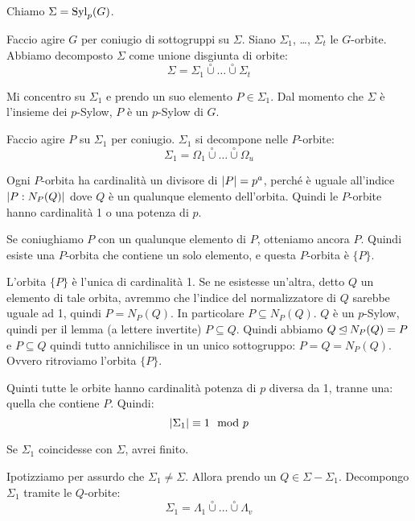 \begin{dimostrazione}
    Chiamo $\Sigma = \operatorname{Syl}_p(G)$.

    Faccio agire $G$ per coniugio di sottogruppi su $\Sigma$.
    Siano $\Sigma_1$, \dots, $\Sigma_t$ le $G$-orbite.
    Abbiamo decomposto $\Sigma$ come unione disgiunta di orbite:
    \begin{equation*}
        \Sigma = \Sigma_1 \overset{\circ}{\cup} \dots \overset{\circ}{\cup} \Sigma_t
    \end{equation*}

    Mi concentro su $\Sigma_1$ e prendo un suo elemento $P \in \Sigma_1$.
    Dal momento che $\Sigma$ è l'insieme dei $p$-Sylow, $P$ è un $p$-Sylow di $G$.

    Faccio agire $P$ su $\Sigma_1$ per coniugio.
    $\Sigma_1$ si decompone nelle $P$-orbite:
    \begin{equation*}
        \Sigma_1 = \Omega_1 \overset{\circ}{\cup} \dots \overset{\circ}{\cup} \Omega_u
    \end{equation*}

    Ogni $P$-orbita ha cardinalità un divisore di $\lvert P \rvert = p^a$, perché è uguale all'indice $\lvert P:N_P(Q) \rvert$
    dove $Q$ è un qualunque elemento dell'orbita.
    Quindi le $P$-orbite hanno cardinalità 1 o una potenza di $p$.

    Se coniughiamo $P$ con un qualunque elemento di $P$, otteniamo ancora $P$.
    Quindi esiste una $P$-orbita che contiene un solo elemento, e questa $P$-orbita è $\{P\}$.

    L'orbita $\{P\}$ è l'unica di cardinalità 1.
    Se ne esistesse un'altra, detto $Q$ un elemento di tale orbita, avremmo che l'indice del normalizzatore di $Q$
    sarebbe uguale ad 1, quindi $P = N_P(Q)$.
    In particolare $P \subseteq N_P(Q)$.
    $Q$ è un $p$-Sylow, quindi per il lemma (a lettere invertite) $P \subseteq Q$.
    Quindi abbiamo $Q \unlhd N_P(Q) = P$ e $P \subseteq Q$ quindi tutto annichilisce in un unico sottogruppo:
    $P = Q = N_P(Q)$.
    Ovvero ritroviamo l'orbita $\{P\}$.

    Quinti tutte le orbite hanno cardinalità potenza di $p$ diversa da 1, tranne una: quella che contiene $P$.
    Quindi:
    \begin{equation*}
        \lvert \Sigma_1 \rvert \equiv 1 \mod p
    \end{equation*}

    Se $\Sigma_1$ coincidesse con $\Sigma$, avrei finito.

    Ipotizziamo per assurdo che $\Sigma_1 \ne \Sigma$.
    Allora prendo un $Q \in \Sigma - \Sigma_1$.
    Decompongo $\Sigma_1$ tramite le $Q$-orbite:
    \begin{equation*}
        \Sigma_1 = \Lambda_1 \overset{\circ}{\cup} \dots \overset{\circ}{\cup} \Lambda_v
    \end{equation*}


\end{dimostrazione}
